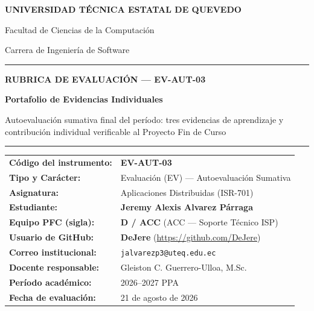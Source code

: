 \documentclass[11pt,a4paper]{article}
\begin{document}
\begin{titlepage}
    \centering
    \vspace*{0.2cm}

    {\large\bfseries UNIVERSIDAD TÉCNICA ESTATAL DE QUEVEDO\par}
    \vspace{0.15cm}
    {\normalsize Facultad de Ciencias de la Computación\par}
    {\normalsize Carrera de Ingeniería de Software\par}
    \vspace{0.8cm}

    \rule{0.85\textwidth}{0.6pt}\par
    \vspace{0.4cm}
    {\Large\bfseries RUBRICA DE EVALUACIÓN --- EV-AUT-03\par}
    \vspace{0.2cm}
    {\large\bfseries Portafolio de Evidencias Individuales\par}
    \vspace{0.25cm}
    {\normalsize Autoevaluación sumativa final del período: tres evidencias de aprendizaje y contribución individual verificable al Proyecto Fin de Curso\par}
    \vspace{0.4cm}
    \rule{0.85\textwidth}{0.6pt}\par
    \vspace{0.8cm}

    \begin{tabular}{ll}
        \textbf{Código del instrumento:}   & \textbf{EV-AUT-03} \\
        \textbf{Tipo y Carácter:}          & Evaluación (EV) --- Autoevaluación Sumativa \\
        \textbf{Asignatura:}               & Aplicaciones Distribuidas (ISR-701) \\
        \textbf{Estudiante:}               & \textbf{Jeremy Alexis Alvarez Párraga} \\
        \textbf{Equipo PFC (sigla):}       & \textbf{D / ACC} (ACC --- Soporte Técnico ISP) \\
        \textbf{Usuario de GitHub:}        & \textbf{DeJere} (\url{https://github.com/DeJere}) \\
        \textbf{Correo institucional:}     & \texttt{jalvarezp3@uteq.edu.ec} \\
        \textbf{Docente responsable:}      & Gleiston C. Guerrero-Ulloa, M.Sc. \\
        \textbf{Período académico:}        & 2026--2027 PPA \\
        \textbf{Fecha de evaluación:}      & 21 de agosto de 2026 \\
    \end{tabular}


\end{titlepage}
\end{document}
